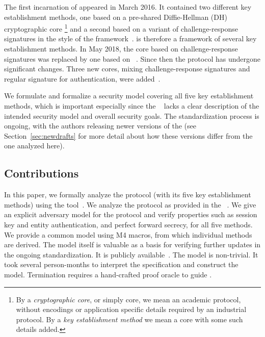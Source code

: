 \documentclass[runningheads, envcountsame, hidelinks, a4paper, draft, x11names]{llncs}
\begin{document}
%
The first incarnation of \mEdhoc{} appeared in March 2016.
%
It contained two different key establishment methods, one based on a
pre-shared Diffie-Hellman (DH) cryptographic core%
\footnote{By a \emph{cryptographic core}, or simply core, we mean an academic protocol,
without encodings or application specific details required by an industrial
protocol.
%
By a \emph{key establishment method} we mean a core with some such details added.
}
and a second based on a
variant of challenge-response signatures in the style of the \mNoise{}
framework~\cite{perrin2016noise}.
%
\mEdhoc{} is therefore a framework of several key establishment methods.
%
In May 2018, the core based on challenge-response signatures was replaced by
one based on \mSigma{}~\cite{bruni-analysis-selander-ace-cose-ecdhe-08}.
%
Since then the protocol has undergone significant changes.
%
Three new cores, mixing challenge-response signatures and regular signature for
authentication, were added~\cite{our-analysis-selander-lake-edhoc-00}.
%

We formulate and formalize a security model covering all five key
establishment methods, which is important especially since the
\mSpec{}~\cite{our-analysis-selander-lake-edhoc-00} lacks a clear description
of the intended security model and
overall security goals.
%
The standardization process is ongoing, with the authors releasing newer
versions of the \mSpec{} (see Section~\ref{sec:newdrafts} for more detail
about how these versions differ from the one analyzed here).
%

\subsection{Contributions}
\label{sec:contributions}
In this paper, we formally analyze the \mEdhoc{} protocol (with its five key
establishment methods) using the \mTamarin{} tool~\cite{DBLP:conf/cav/MeierSCB13}.
%
We analyze the protocol as provided in the
\mSpec{}~\cite{our-analysis-selander-lake-edhoc-00}.
%
We give an explicit adversary model for the protocol and verify
properties such as session key and entity authentication, and perfect forward
secrecy, for all five methods.
%
We provide a common \mTamarin{} model using M4 macros, from which
individual methods are derived.
%
The model itself is valuable as a basis for verifying further updates in the
ongoing standardization.
%
It is publicly available~\cite{edhocTamarinRepo}.
%
The model is non-trivial.
%
It took several person-months to interpret the
specification and construct the model.
%
Termination requires a hand-crafted proof oracle to guide \mTamarin{}.
%
\end{document}
